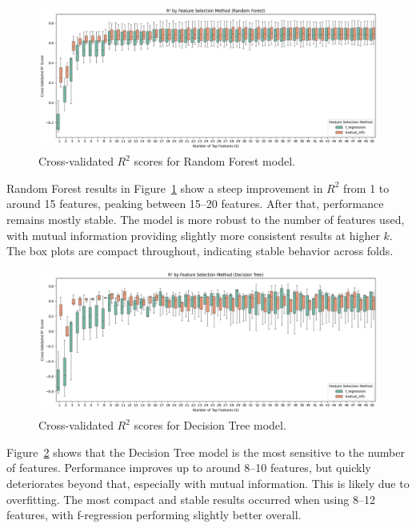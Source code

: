 \begin{figure}[!ht]
    \centering
    \includegraphics[width=\textwidth]{figures/box50_RF.png}
    \caption{Cross-validated $R^2$ scores for Random Forest model.}
    \label{fig:box_rf}
\end{figure}
\FloatBarrier

Random Forest results in Figure~\ref{fig:box_rf} show a steep improvement in $R^2$ from 1 to around 15 features, peaking between 15–20 features. After that, performance remains mostly stable. The model is more robust to the number of features used, with mutual information providing slightly more consistent results at higher $k$. The box plots are compact throughout, indicating stable behavior across folds.

\begin{figure}[!ht]
    \centering
    \includegraphics[width=\textwidth]{figures/box50_DT.png}
    \caption{Cross-validated $R^2$ scores for Decision Tree model.}
    \label{fig:box_dt}
\end{figure}
\FloatBarrier

Figure~\ref{fig:box_dt} shows that the Decision Tree model is the most sensitive to the number of features. Performance improves up to around 8–10 features, but quickly deteriorates beyond that, especially with mutual information. This is likely due to overfitting. The most compact and stable results occurred when using 8–12 features, with f-regression performing slightly better overall.

